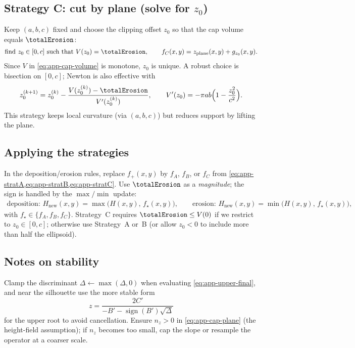 \subsection*{Strategy C: cut by plane (solve for $z_0$)}
Keep $(a,b,c)$ fixed and choose the clipping offset $z_0$ so that the cap volume equals $\totalErosion$:
\begin{align}
\label{eq:app-stratC}
\text{find }z_0\in[0,c]\ \text{such that}\ V(z_0)=\totalErosion,\qquad f_C(x,y)=z_{\text{plane}}(x,y)+g_{z_0}(x,y).
\end{align}
Since $V$ in \cref{eq:app-cap-volume} is monotone, $z_0$ is unique. A robust choice is bisection on $[0,c]$; Newton is also effective with
\begin{align}
z_0^{(k+1)}=z_0^{(k)}-\frac{V(z_0^{(k)})-\totalErosion}{V'(z_0^{(k)})},\qquad
V'(z_0)=-\pi a b\Bigl(1-\frac{z_0^2}{c^2}\Bigr).
\end{align}
This strategy keeps local curvature (via $(a,b,c)$) but reduces support by lifting the plane.

\subsection*{Applying the strategies}
In the deposition/erosion rules, replace $f_{+}(x,y)$ by $f_A$, $f_B$, or $f_C$ from \cref{eq:app-stratA,eq:app-stratB,eq:app-stratC}. Use $\totalErosion$ as a \emph{magnitude}; the sign is handled by the $\max/\min$ update:
\begin{align}
\text{deposition: } H_{\text{new}}(x,y)=\max\!\bigl(H(x,y),\,f_\star(x,y)\bigr),\qquad
\text{erosion: } H_{\text{new}}(x,y)=\min\!\bigl(H(x,y),\,f_\star(x,y)\bigr),
\end{align}
with $f_\star\in\{f_A,f_B,f_C\}$. Strategy~C requires $\totalErosion\le V(0)$ if we restrict to $z_0\in[0,c]$; otherwise use Strategy~A or~B (or allow $z_0<0$ to include more than half the ellipsoid).

\subsection*{Notes on stability}
Clamp the discriminant $\Delta\leftarrow\max(\Delta,0)$ when evaluating \cref{eq:app-upper-final}, and near the silhouette use the more stable form
\[
z=\frac{2C'}{-B'-\operatorname{sign}(B')\sqrt{\Delta}}
\]
for the upper root to avoid cancellation. Ensure $n_z>0$ in \cref{eq:app-cap-plane} (the height-field assumption); if $n_z$ becomes too small, cap the slope or resample the operator at a coarser scale.















